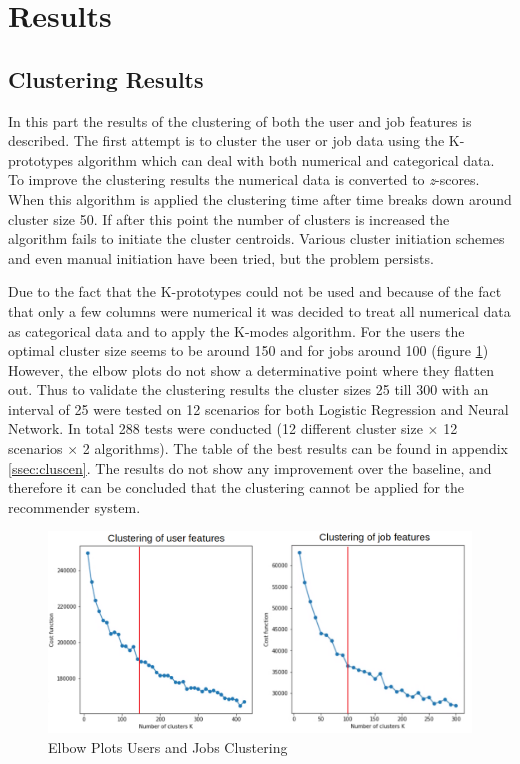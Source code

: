 \section{Results}
\label{sec:rslts}


\subsection{Clustering Results}
\label{ssec:clures}
In this part the results of the clustering of both the user and job features is described.
The first attempt is to cluster the user or job data using the K-prototypes algorithm which can deal with both numerical and categorical data.
To improve the clustering results the numerical data is converted to \textit{z}-scores.
When this algorithm is applied the clustering time after time breaks down around cluster size 50. If after this point the number of clusters is increased the algorithm fails to initiate the cluster centroids.
Various cluster initiation schemes and even manual initiation have been tried, but the problem persists.

Due to the fact that the K-prototypes could not be used and because of the fact that only a few columns were numerical it was decided to treat all numerical data as categorical data and to apply the K-modes algorithm.
For the users the optimal cluster size seems to be around 150 and for jobs around 100 (figure \ref{fig:eb})
However, the elbow plots do not show a determinative point where they flatten out.
Thus to validate the clustering results the cluster sizes 25 till 300 with an interval of 25 were tested on 12 scenarios for both Logistic Regression and Neural Network.
In total 288 tests were conducted (12 different cluster size $\times$ 12 scenarios $\times$ 2 algorithms). 
The table of the best results can be found in appendix \ref{ssec:cluscen}.
The results do not show any improvement over the baseline, and therefore it can be concluded that the clustering cannot be applied for the recommender system.

\begin{figure}[H]
    \centering
    \includegraphics[width=\linewidth]{ThesisTemplate/Images/Clustering.png}
    \caption{\label{fig:eb} \footnotesize{Elbow Plots Users and Jobs Clustering}}
\end{figure}

